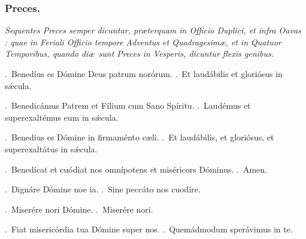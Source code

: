 \documentclass[12pt]{article} %
\def\noinitial{%
\gresetfirstlineaboveinitial{\textcolor{benred8}{\small \textsc{\textbf{}}}}{\textcolor{benred8}{\small \textsc{\textbf{}}}}
\setspaceafterinitial{0pt plus 0em minus 0em}%
\setspacebeforeinitial{0pt plus 0em minus 0em}%
\relax %
}
\newenvironment{rubric}{\vspace{2 mm}\color{benred8} \itshape \leftskip 0in \setlength{\parindent}{0.25in}}{\vspace{2 mm}}
\newenvironment{response}{\leftskip 0in \setlength{\parindent}{0in}}{\vspace{2 mm}}
\let\oldVbar\Vbar
\renewcommand{\Vbar}{\textcolor{benred8}{\oldVbar .}}
\let\oldRbar\Rbar
\renewcommand{\Rbar}{\textcolor{benred8}{\oldRbar .}}
\begin{document}
{\noinitial
{}

}

\newpage


\subsubsection*{Preces.}

\begin{rubric}
Sequentes Preces semper dicuntur, pr\ae terquam in Officio Duplici, et infra Oavas : quae in Feriali Officio tempore Adventus et Quadragesim\ae, et in Quatuor Temporibus, quando di\ae\ sunt Preces in Vesperis, dicuntur flexis genibus.

\end{rubric}

\gresetfirstlineaboveinitial{\small \textsc{ \textbf{\textcolor{benred8}{\Vbar}}}}{\small \textsc{ \textbf{\textcolor{benred8}{\Vbar}}}}

\vspace{2mm}

\gresetfirstlineaboveinitial{\small \textsc{ \textbf{\textcolor{benred8}{\Vbar}}}}{\small \textsc{ \textbf{\textcolor{benred8}{\Vbar}}}}

\vspace{2mm}

\gresetfirstlineaboveinitial{\small \textsc{ \textbf{\textcolor{benred8}{\Vbar}}}}{\small \textsc{ \textbf{\textcolor{benred8}{\Vbar}}}}

\begin{response}
\Vbar\ Bened\'{i}us es D\'{o}mine Deus patrum nor\'{o}rum.
\Rbar\ Et laud\'{a}bilis et glori\'{o}sus in s\'{\ae}cula.

\Vbar\ Benedic\'{a}mus Patrem et F\'{i}lium cum Sano Sp\'{i}ritu.
\Rbar\ Laud\'{e}mus et superexalt\'{e}mus eum in s\'{\ae}cula.

\Vbar\ Bened\'{i}us es D\'{o}mine in firmam\'{e}nto c\ae li.
\Rbar\ Et laud\'{a}bilis, et glori\'{o}sus, et superexalt\'{a}tus in s\'{\ae}cula.

\Vbar\ Bened\'{i}cat et cu\'{o}diat nos omn\'{i}potens et mis\'{e}ricors D\'{o}minus.
\Rbar\ Amen.

\Vbar\ Dign\'{a}re D\'{o}mine noe ia.
\Rbar\ Sine pecc\'{a}to nos cuod\'{i}re.

\Vbar\ Miser\'{e}re nori D\'{o}mine.
\Rbar\ Miser\'{e}re nori.

\Vbar\ Fiat miseric\'{o}rdia tua D\'{o}mine super nos. 
\Rbar\ Quem\'{a}dmodum sper\'{a}vimus in te.

\end{response}
\end{document}
